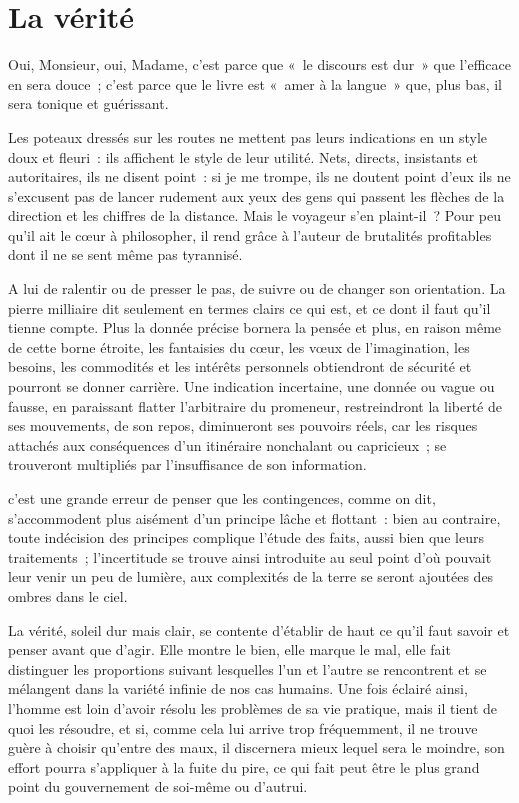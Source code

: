 \documentclass[french,twoside]{book} %
\begin{document}
\section[La vérité]{La vérité}
\noindent Oui, Monsieur, oui, Madame, c’est parce que « le discours est dur » que l’efficace en sera douce ; c’est parce que le livre est « amer à la langue » que, plus bas, il sera tonique et guérissant.\par
Les poteaux dressés sur les routes ne mettent pas leurs indications en un style doux et fleuri : ils affichent le style de leur utilité. Nets, directs, insistants et autoritaires, ils ne disent point : si je me trompe, ils ne doutent point d’eux ils ne s’excusent pas de lancer rudement aux yeux des gens qui passent les flèches de la direction et les chiffres de la distance. Mais le voyageur s’en plaint-il ? Pour peu qu’il ait le cœur à philosopher, il rend grâce à l’auteur de brutalités profitables dont il ne se sent même pas tyrannisé.\par
A lui de ralentir ou de presser le pas, de suivre ou de changer son orientation. La pierre milliaire dit seulement en termes clairs ce qui est, et ce dont il faut qu’il tienne compte. Plus la donnée précise bornera la pensée et plus, en raison même de cette borne étroite, les fantaisies du cœur, les vœux de l’imagination, les besoins, les commodités et les intérêts personnels obtiendront de sécurité et pourront se donner carrière. Une indication incertaine, une donnée ou vague ou fausse, en paraissant flatter l’arbitraire du promeneur, restreindront la liberté de ses mouvements, de son repos, diminueront ses pouvoirs réels, car les risques attachés aux conséquences d’un itinéraire nonchalant ou capricieux ; se trouveront multipliés par l’insuffisance de son information.\par
c’est une grande erreur de penser que les contingences, comme on dit, s’accommodent plus aisément d’un principe lâche et flottant : bien au contraire, toute indécision des principes complique l’étude des faits, aussi bien que leurs traitements ; l’incertitude se trouve ainsi introduite au seul point d’où pouvait leur venir un peu de lumière, aux complexités de la terre se seront ajoutées des ombres dans le ciel.\par
La vérité, soleil dur mais clair, se contente d’établir de haut ce qu’il faut savoir et penser avant que d’agir. Elle montre le bien, elle marque le mal, elle fait distinguer les proportions suivant lesquelles l’un et l’autre se rencontrent et se mélangent dans la variété infinie de nos cas humains. Une fois éclairé ainsi, l’homme est loin d’avoir résolu les problèmes de sa vie pratique, mais il tient de quoi les résoudre, et si, comme cela lui arrive trop fréquemment, il ne trouve guère à choisir qu’entre des maux, il discernera mieux lequel sera le moindre, son effort pourra s’appliquer à la fuite du pire, ce qui fait peut être le plus grand point du gouvernement de soi-même ou d’autrui.\par
\end{document}
